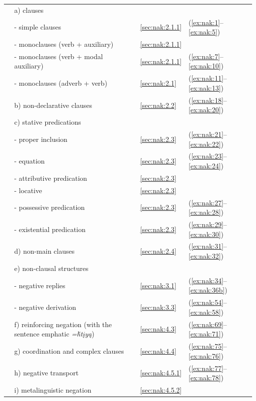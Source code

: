 \documentclass[output=paper,colorlinks,citecolor=brown]{langscibook}
\begin{document}
\begin{table}
\begin{tabularx}{\textwidth}{lQll}
& {   a) clauses} && \\
& {     - simple clauses}& {\ref{sec:nak:2.1.1}} &(\ref{ex:nak:1}--\ref{ex:nak:5})\\
& {     - monoclauses (verb + auxiliary)} & {\ref{sec:nak:2.1.1}} & {} \\
& {     - monoclauses (verb + modal auxiliary)} & {\ref{sec:nak:2.1.1}} & {(\ref{ex:nak:7}--\ref{ex:nak:10})} \\
& {     - monoclauses (adverb + verb)} & {\ref{sec:nak:2.1}} & { (\ref{ex:nak:11}--\ref{ex:nak:13})} \\
& {   b) non-declarative clauses} & {\ref{sec:nak:2.2}} & {(\ref{ex:nak:18}--\ref{ex:nak:20})} \\
& {   c) stative predications} &&\\
& {      - proper inclusion}  & {\ref{sec:nak:2.3}} &  {(\ref{ex:nak:21}--\ref{ex:nak:22})}\\
& {      - equation}  & {\ref{sec:nak:2.3}} & {(\ref{ex:nak:23}--\ref{ex:nak:24})} \\
& {      - attributive predication}  & {\ref{sec:nak:2.3}} & {} \\
& {      - locative}  & {\ref{sec:nak:2.3}} & {} \\
& {      - possessive predication} & {\ref{sec:nak:2.3}} & { (\ref{ex:nak:27}--\ref{ex:nak:28})} \\
& {      - existential predication} & {\ref{sec:nak:2.3}} & {(\ref{ex:nak:29}--\ref{ex:nak:30})} \\
& {   d) non-main clauses}  & {\ref{sec:nak:2.4}} & {(\ref{ex:nak:31}--\ref{ex:nak:32})} \\
& {   e) non-clausal structures}&& \\
& {     - negative replies}  & {\ref{sec:nak:3.1}} & {(\ref{ex:nak:34}--\ref{ex:nak:36b})} \\
& {     - negative derivation} & {\ref{sec:nak:3.3}} & {(\ref{ex:nak:54}--\ref{ex:nak:58})} \\
& {   f) reinforcing negation (with the sentence emphatic \textit{=ȟtįyą})}  & {\ref{sec:nak:4.3}} & {(\ref{ex:nak:69}--\ref{ex:nak:71})} \\
& {   g) coordination and complex clauses} & {\ref{sec:nak:4.4}} & {(\ref{ex:nak:75}--\ref{ex:nak:76})} \\
& {   h) negative transport} & {\ref{sec:nak:4.5.1}} & {(\ref{ex:nak:77}--\ref{ex:nak:78})} \\
& {   i) metalinguistic negation}   & {\ref{sec:nak:4.5.2}} & {}\\


\end{tabularx}
\end{table}
\end{document}
